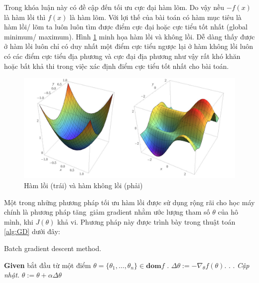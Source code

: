 Trong khóa luận này có đề cập đến tối ưu cực đại hàm lõm. Do vậy nều $-f(x)$ là hàm lồi thì $f(x)$ là hàm lõm. Với lợi thế của bài toán có hàm mục tiêu là hàm lồi/ lõm ta luôn luôn tìm được điểm cực đại hoặc cực tiểu tốt nhất (global minimum/ maximum). Hình \ref{fig:convexnonconvex} minh họa hàm lồi và không lồi. Dễ dàng thấy được ở hàm lồi luôn chỉ có duy nhất một điểm cực tiểu ngược lại ở hàm không lồi luôn có các điểm cực tiểu địa phương và cực đại địa phương như vậy rất khó khăn hoặc bất khả thi trong việc xác định điểm cực tiểu tốt nhất cho bài toán.
\begin{figure}[H]
	\centering
	\includegraphics[width=1\linewidth]{Chapter2/Chapter2Figs/convexandnoconvex.jpg}
	\caption{Hàm lồi (trái) và hàm không lồi (phải)}
	\label{fig:convexnonconvex}
\end{figure}
Một trong những phương pháp tối ưu hàm lồi được sử dụng rộng rãi cho học máy chính là phương pháp tăng\ giảm gradient nhằm ước lượng tham số $\theta$ của hô mình, khi $J(\theta)$ khả vi. Phương pháp này được trình bày trong thuật toán \ref{alg:GD} \cite{boyd2004convex} dưới đây:
\begin{algorithm}\caption{\label{alg:GD} Batch gradient descent method.}
	\begin{algorithmic}[1]
		\STATE \textbf{Given} bắt đầu từ một điểm $\theta = \{\theta_1,\dots,\theta_n\} \in \textbf{dom} f$
		\REPEAT
		. $\Delta \theta:=-\nabla_\theta f\left( \theta\right) $.
		. 
		. \textit{Cập nhật.} $\theta:=\theta+\alpha\Delta \theta$
	\end{algorithmic}
\end{algorithm}

